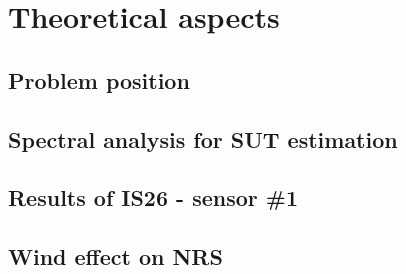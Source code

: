 \documentclass[a4paper, 12pt]{report}
\begin{document}
 \sloppy
 
\tableofcontents
\part{Theoretical aspects}
\chapter{Problem position}


\chapter{Spectral analysis for SUT estimation}
\label{chap:spectralanalysis}


%

\chapter{Results of IS26 - sensor \#1}
\label{chap:IS26results}



\chapter{Wind effect on NRS}
\label{chap:windonNRS}

\end{document}
